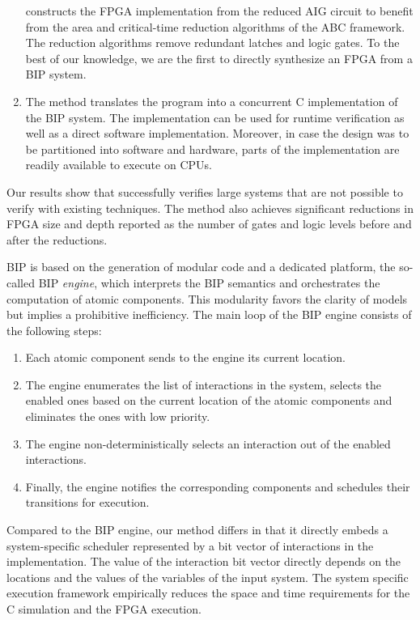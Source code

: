 \begin{enumerate}
  \biptool{} constructs the FPGA implementation from the reduced AIG circuit 
  to benefit from the area and critical-time reduction algorithms 
  of the ABC framework. 
  The reduction algorithms remove redundant latches and logic gates.  
  To the best of our knowledge, we are the first to directly synthesize an FPGA from a BIP system.
  
\item 
    The method translates the \caig program into a concurrent C 
    implementation of the BIP system.
    The implementation can be used for runtime verification as well as a direct
    software implementation. 
    Moreover, in case the design was to be partitioned into software and hardware, 
    parts of the implementation are readily available to execute on CPUs. 
  
\end{enumerate}
%

Our results show that \biptool{} successfully verifies large systems that are not possible to verify with existing techniques. 
The method also achieves significant reductions in FPGA size and depth reported as the 
number of gates and logic levels before and after the reductions.

BIP is based on the generation of modular code and a dedicated platform, the so-called BIP \emph{engine}, which interprets the BIP semantics and orchestrates the computation of atomic components. This modularity favors the clarity of models but implies a prohibitive inefficiency. The main loop of the BIP engine consists of the following steps:
%
\begin{enumerate}
\item Each atomic component sends to the engine its current location.
\item The engine enumerates the list of interactions in the system, 
  selects the enabled ones based on the current location of the atomic 
  components and eliminates the ones with low priority.
\item The engine non-deterministically selects an interaction out of the enabled interactions.
\item Finally, the engine notifies the corresponding components and schedules their transitions for execution. 
\end{enumerate}
%
Compared to the BIP engine, our method differs in that it directly embeds a system-specific scheduler represented by a bit vector of interactions in the implementation.
The value of the  interaction bit vector directly depends on the locations and the values of the variables of the input system. 
The system specific execution framework empirically reduces the space and time requirements for the C simulation and the FPGA execution. 

